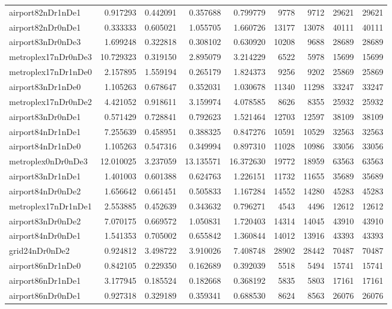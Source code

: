 \begin{longtable}{|l|r|r|r|r|r|r|r|r|}
airport82nDr1nDe1 & 0.917293 & 0.442091 & 0.357688 & 0.799779 & 9778 & 9712 & 29621 & 29621 \\
airport82nDr0nDe1 & 0.333333 & 0.605021 & 1.055705 & 1.660726 & 13177 & 13078 & 40111 & 40111 \\
airport83nDr0nDe3 & 1.699248 & 0.322818 & 0.308102 & 0.630920 & 10208 & 9688 & 28689 & 28689 \\
metroplex17nDr0nDe3 & 10.729323 & 0.319150 & 2.895079 & 3.214229 & 6522 & 5978 & 15699 & 15699 \\
metroplex17nDr1nDe0 & 2.157895 & 1.559194 & 0.265179 & 1.824373 & 9256 & 9202 & 25869 & 25869 \\
airport83nDr1nDe0 & 1.105263 & 0.678647 & 0.352031 & 1.030678 & 11340 & 11298 & 33247 & 33247 \\
metroplex17nDr0nDe2 & 4.421052 & 0.918611 & 3.159974 & 4.078585 & 8626 & 8355 & 25932 & 25932 \\
airport83nDr0nDe1 & 0.571429 & 0.728841 & 0.792623 & 1.521464 & 12703 & 12597 & 38109 & 38109 \\
airport84nDr1nDe1 & 7.255639 & 0.458951 & 0.388325 & 0.847276 & 10591 & 10529 & 32563 & 32563 \\
airport84nDr1nDe0 & 1.105263 & 0.547316 & 0.349994 & 0.897310 & 11028 & 10986 & 33056 & 33056 \\
metroplex0nDr0nDe3 & 12.010025 & 3.237059 & 13.135571 & 16.372630 & 19772 & 18959 & 63563 & 63563 \\
airport83nDr1nDe1 & 1.401003 & 0.601388 & 0.624763 & 1.226151 & 11732 & 11655 & 35689 & 35689 \\
airport84nDr0nDe2 & 1.656642 & 0.661451 & 0.505833 & 1.167284 & 14552 & 14280 & 45283 & 45283 \\
metroplex17nDr1nDe1 & 2.553885 & 0.452639 & 0.343632 & 0.796271 & 4543 & 4496 & 12612 & 12612 \\
airport83nDr0nDe2 & 7.070175 & 0.669572 & 1.050831 & 1.720403 & 14314 & 14045 & 43910 & 43910 \\
airport84nDr0nDe1 & 1.541353 & 0.705002 & 0.655842 & 1.360844 & 14012 & 13916 & 43393 & 43393 \\
grid24nDr0nDe2 & 0.924812 & 3.498722 & 3.910026 & 7.408748 & 28902 & 28442 & 70487 & 70487 \\
airport86nDr1nDe0 & 0.842105 & 0.229350 & 0.162689 & 0.392039 & 5518 & 5494 & 15741 & 15741 \\
airport86nDr1nDe1 & 3.177945 & 0.185524 & 0.182668 & 0.368192 & 5835 & 5803 & 17161 & 17161 \\
airport86nDr0nDe1 & 0.927318 & 0.329189 & 0.359341 & 0.688530 & 8624 & 8563 & 26076 & 26076 \\

\end{longtable}
